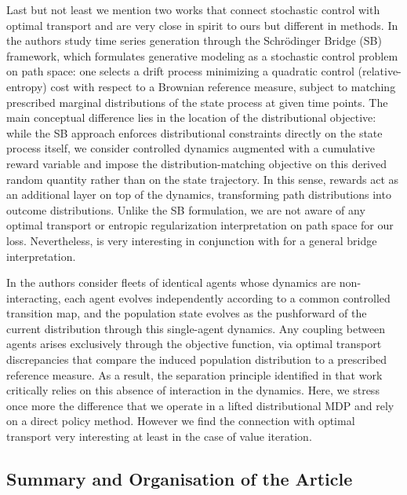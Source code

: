 \documentclass[reqno, 11pt]{amsart}%
\theoremstyle{definition}
\begin{document}
Last but not least we mention two works that connect stochastic control with optimal transport and are very close in spirit to ours but different in methods. In \cite{Alouadi2025SBTS} the authors study time series generation through the Schrödinger Bridge (SB) framework, which formulates generative modeling as a stochastic control problem on path space: one selects a drift process minimizing a quadratic control (relative-entropy) cost with respect to a Brownian reference measure, subject to matching prescribed marginal distributions of the state process at given time points. The main conceptual difference lies in the location of the distributional objective: while the SB approach enforces distributional constraints directly on the state process itself, we consider controlled dynamics augmented with a cumulative reward variable and impose the distribution-matching objective on this derived random quantity rather than on the state trajectory. In this sense, rewards act as an additional layer on top of the dynamics, transforming path distributions into outcome distributions. Unlike the SB formulation, we are not aware of any optimal transport or entropic regularization interpretation on path space for our loss. Nevertheless, \cite{Alouadi2025SBTS} is very interesting in conjunction with \cite{wiltzer2022distributional} for a general bridge interpretation. 

 In \cite{TerpinLanzettiDorflers2024DPOT} the authors consider fleets of identical agents whose dynamics are non-interacting, each agent evolves independently according to a common controlled transition map, and the population state evolves as the pushforward of the current distribution through this single-agent dynamics. Any coupling between agents arises exclusively through the objective function, via optimal transport discrepancies that compare the induced population distribution to a prescribed reference measure. As a result, the separation principle identified in that work critically relies on this absence of interaction in the dynamics. Here, we stress once more the difference that we operate in a lifted distributional MDP and rely on a direct policy method. However we find the connection with optimal transport very interesting at least in the case of value iteration. 

 
\subsection{Summary and Organisation of the Article}
\end{document}

